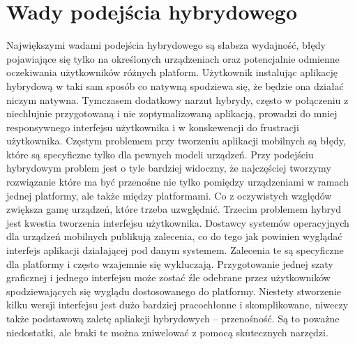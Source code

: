 \documentclass[brudnopis]{xmgr}
\begin{document}
\section{Wady podejścia hybrydowego}
Największymi wadami podejścia hybrydowego są słabsza wydajność, błędy
pojawiające się tylko na określonych urządzeniach oraz potencjalnie odmienne oczekiwania
użytkowników różnych platform. Użytkownik instalując aplikację hybrydową w taki sam sposób co 
natywną spodziewa się, że będzie ona działać niczym natywna. Tymczasem
dodatkowy narzut hybrydy, często w połączeniu z niechlujnie przygotowaną i nie
zoptymalizowaną aplikacją, prowadzi do mniej responsywnego interfejsu
użytkownika i w konskewencji do frustracji użytkownika. Częstym problemem przy
tworzeniu aplikacji mobilnych są błędy, które są specyficzne tylko dla pewnych modeli urządzeń. Przy podejściu hybrydowym problem jest o tyle bardziej widoczny, że
najczęściej tworzymy rozwiązanie które ma być przenośne nie tylko pomiędzy urządzeniami w ramach jednej platformy, ale także między platformami. Co z oczywistych względów zwiększa gamę urządzeń, które trzeba uzwględnić. Trzecim problemem hybryd jest kwestia
tworzenia interfejsu użytkownika. Dostawcy systemów operacyjnych dla urządzeń
mobilnych publikują zalecenia, co do tego jak powinien wyglądać interfejs aplikacji
działającej pod danym systemem. Zalecenia te są specyficzne dla platformy i często
wzajemnie się wykluczają. Przygotowanie jednej szaty graficznej i jednego interfejsu
może zostać źle odebrane przez użytkowników spodziewających się wyglądu
dostosowanego do platformy. Niestety stworzenie kilku wersji interfejsu jest dużo
bardziej pracochłonne i skomplikowane, niweczy także podstawową zaletę apliakcji
hybrydowych – przenośność. 
Są to poważne niedostatki, ale braki te można zniwelować z pomocą skutecznych narzędzi.
\end{document}

